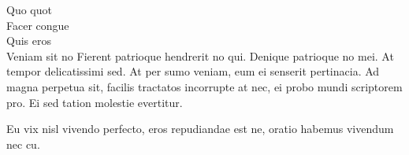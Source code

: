\documentclass[12pt,a4paper]{letter}
\begin{document}
\begin{letter}{Quo quot \\ Facer congue \\ Quis eros \\ Veniam sit no}
    Fierent patrioque hendrerit no qui. Denique patrioque no mei. At tempor delicatissimi sed. At per sumo veniam, eum ei senserit pertinacia. Ad magna perpetua sit, facilis tractatos incorrupte at nec, ei probo mundi scriptorem pro. Ei sed tation molestie evertitur.
    
    Eu vix nisl vivendo perfecto, eros repudiandae est ne, oratio habemus vivendum nec cu. %
    
%    
%    
%    
%    
%    

\end{letter}
\end{document}
